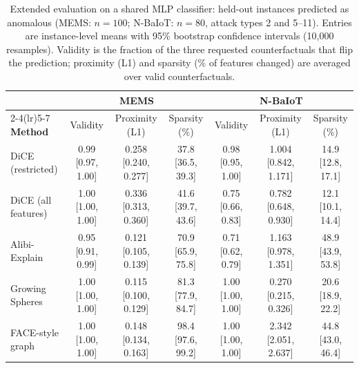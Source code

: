 \begin{table}[t]
\centering
\caption{Extended evaluation on a shared MLP classifier: held-out instances predicted as anomalous (MEMS: $n=100$; N-BaIoT: $n=80$, attack types 2 and 5--11). Entries are instance-level means with 95\% bootstrap confidence intervals (10{,}000 resamples). Validity is the fraction of the three requested counterfactuals that flip the prediction; proximity (L1) and sparsity (\% of features changed) are averaged over valid counterfactuals.}
\label{tab:ext-main}
\scriptsize
\setlength{\tabcolsep}{3.5pt}
\begin{tabular}{@{}l ccc ccc@{}}
\toprule
 & \multicolumn{3}{c}{\textbf{MEMS}} & \multicolumn{3}{c}{\textbf{N-BaIoT}} \\
\cmidrule(lr){2-4}\cmidrule(lr){5-7}
\textbf{Method} & Validity & Proximity (L1) & Sparsity (\%) & Validity & Proximity (L1) & Sparsity (\%) \\
\midrule
DiCE (restricted) & 0.99 [0.97, 1.00] & 0.258 [0.240, 0.277] & 37.8 [36.5, 39.3] & 0.98 [0.95, 1.00] & 1.004 [0.842, 1.171] & 14.9 [12.8, 17.1] \\
DiCE (all features) & 1.00 [1.00, 1.00] & 0.336 [0.313, 0.360] & 41.6 [39.7, 43.6] & 0.75 [0.66, 0.83] & 0.782 [0.648, 0.930] & 12.1 [10.1, 14.4] \\
Alibi-Explain & 0.95 [0.91, 0.99] & 0.121 [0.105, 0.139] & 70.9 [65.9, 75.8] & 0.71 [0.62, 0.79] & 1.163 [0.978, 1.351] & 48.9 [43.9, 53.8] \\
Growing Spheres & 1.00 [1.00, 1.00] & 0.115 [0.100, 0.129] & 81.3 [77.9, 84.7] & 1.00 [1.00, 1.00] & 0.270 [0.215, 0.326] & 20.6 [18.9, 22.2] \\
FACE-style graph & 1.00 [1.00, 1.00] & 0.148 [0.134, 0.163] & 98.4 [97.6, 99.2] & 1.00 [1.00, 1.00] & 2.342 [2.051, 2.637] & 44.8 [43.0, 46.4] \\
\bottomrule
\end{tabular}
\end{table}
